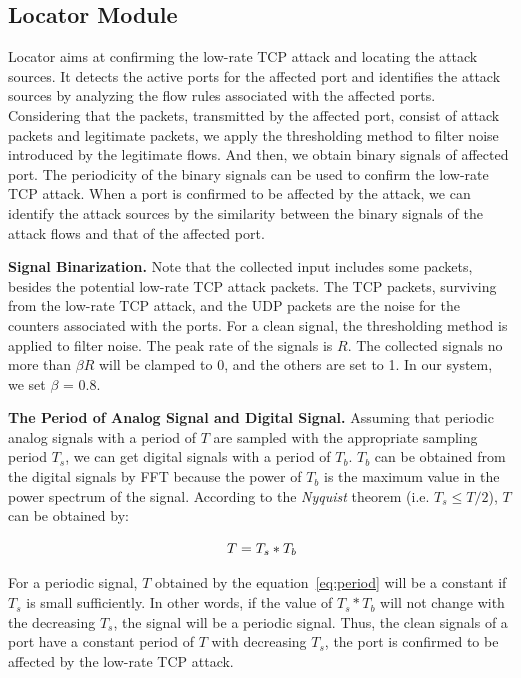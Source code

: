 \documentclass[conference]{IEEEtran}
\begin{document}
\subsection{Locator Module}

Locator aims at confirming the low-rate TCP attack and locating the attack sources. It detects the active ports for the affected port and identifies the attack sources by analyzing the flow rules associated with the affected ports. Considering that the packets, transmitted by the affected port, consist of attack packets and legitimate packets, we apply the thresholding method to filter noise introduced by the legitimate flows. And then, we obtain binary signals of affected port. The periodicity of the binary signals can be used to confirm the low-rate TCP attack. When a port is confirmed to be affected by the attack, we can identify the attack sources by the similarity between the binary signals of the attack flows and that of the affected port.

\noindent \textbf{Signal Binarization.} Note that the collected input includes some packets, besides the potential low-rate TCP attack packets. The TCP packets, surviving from the low-rate TCP attack, and the UDP packets are the noise for the counters associated with the ports. For a clean signal, the thresholding method is applied to filter noise. The peak rate of the signals is $R$. The collected signals no more than $\beta R$ will be clamped to 0, and the others are set to 1. In our system, we set $\beta$ = 0.8.

\noindent \textbf{The Period of Analog Signal and Digital Signal.} Assuming that periodic analog signals with a period of $T$ are sampled with the appropriate sampling period $T_s$, we can get digital signals with a period of $T_b$. $T_b$ can be obtained from the digital signals by FFT because the power of $T_b$ is the maximum value in the power spectrum of the signal.
According to the \emph{Nyquist} theorem (i.e. $T_s \le T/2$), $T$ can be obtained by:

\vspace{-0.05in}
\begin{equation}\label{eq:period}
\ T = T_s * T_b
\vspace{-0.05in}
\end{equation}




For a periodic signal, $T$ obtained by the equation~\ref{eq:period} will be a constant if $T_s$ is small sufficiently. In other words, if the value of $T_s * T_b$ will not change with the decreasing $T_s$, the signal will be a periodic signal. Thus, the clean signals of a port have a constant period of $T$ with decreasing $T_s$, the port is confirmed to be affected by the low-rate TCP attack.
\end{document}
